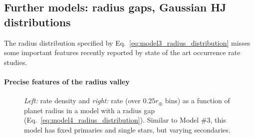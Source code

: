 \documentclass[12pt,modern]{aastex61}
\begin{document}

\subsection{Further models: radius gaps, Gaussian HJ distributions}
\label{sec:further_models}

The radius distribution specified by Eq.~\ref{eq:model3_radius_distribution} 
misses some important features recently reported by state of the art 
occurrence rate studies.

\paragraph{Precise features of the radius valley}

\begin{figure}[!tb]
    \centering
    \caption{
        {\it Left:} rate density and {\it right:} rate (over $0.25r_\oplus$ 
        bins) as a function of planet radius in a model with a radius gap 
        (Eq.~\ref{eq:model4_radius_distribution}).
        Similar to Model \#3, this model has fixed primaries and single stars, 
        but varying secondaries.
    }
    \label{fig:model_4}
\end{figure}
\end{document}
